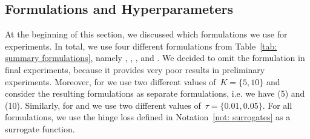 \subsection{Formulations and Hyperparameters}

At the beginning of this section, we discussed which formulations we use for experiments. In total, we use four different formulations from Table~\ref{tab: summary formulations}, namely \TopPush, \TopPushK, \tauFPL, and \PatMatNP. We decided to omit the \GrillNP formulation in final experiments, because it provides very poor results in preliminary experiments. Moreover, for \TopPushK we use two different values of~$K = \{5, 10\}$ and consider the resulting formulations as separate formulations, i.e. we have \TopPushK(5) and \TopPushK(10). Similarly, for \tauFPL and \PatMat we use two different values of~$\tau = \{0.01, 0.05\}.$ For all formulations, we use the hinge loss defined in Notation~\ref{not: surrogates} as a surrogate function.

